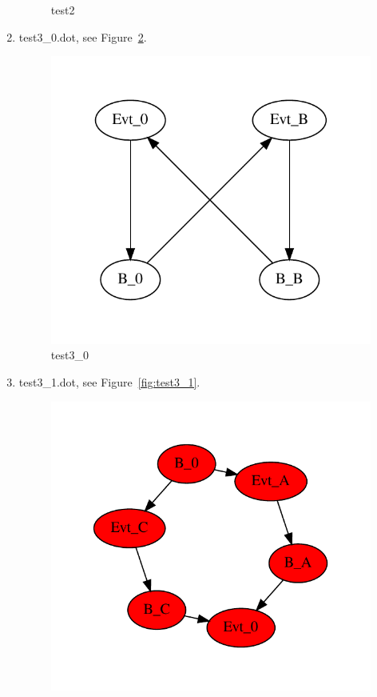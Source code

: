 \documentclass[12pt,a4paper]{report}
\begin{document}
\begin{enumerate}
\begin{figure}
        \caption{test2}
        \label{fig:test2}
    \end{figure}
\item test3\_0.dot, see Figure~\ref{fig:test3_0}.
    \begin{figure}
        \centering 
        \includegraphics*[width=1.0\textwidth,keepaspectratio]{TestPattern/test3_0.pdf}
        \caption{test3\_0}
        \label{fig:test3_0}
    \end{figure}
\item test3\_1.dot, see Figure~\ref{fig:test3_1}.
    \begin{figure}
        \centering 
        \includegraphics*[width=1.0\textwidth,keepaspectratio]{TestPattern/test3_1.pdf}

\end{figure}
\end{enumerate}
\end{document}
